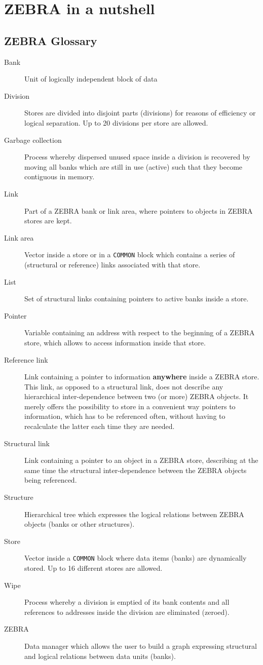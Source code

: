 \chapter{\protect\label{NUTSHEL}ZEBRA in a nutshell}
\section{ZEBRA Glossary}
\begin{description}
\item[Bank]Unit of logically independent block of data
\item[Division]Stores are divided into disjoint parts (divisions)
for reasons of efficiency or logical separation.
Up to 20 divisions per store are allowed.
\item[Garbage collection]Process whereby dispersed unused space
inside a division is recovered by moving all banks which are still
in use (active) such that they become contiguous in memory.
\item[Link]Part of a ZEBRA bank or link area, where pointers to objects
in ZEBRA stores are kept.
\item[Link area]Vector inside a store or in a {\tt COMMON} block which
contains a series of (structural or reference) links associated with that
store. \item[List]Set of structural links containing
pointers to active banks inside a store.
\item[Pointer]Variable containing an address with respect to the beginning of
a ZEBRA store, which allows to access information inside that store.
\item[Reference link]Link containing a pointer to information {\bf anywhere}
inside a ZEBRA store.
This link, as opposed to a structural link, does not describe
any hierarchical inter-dependence between two (or more) ZEBRA objects.
It merely offers the possibility to store in a convenient way
pointers to information, which has to be referenced often,
without having to recalculate the latter each time they are needed.
\item[Structural link]Link containing a pointer to an object in a ZEBRA store,
describing at the same time the structural inter-dependence
between the ZEBRA objects being referenced.
\item[Structure]Hierarchical tree which expresses the logical relations
between ZEBRA objects (banks or other structures).
\item[Store]Vector inside a {\tt COMMON} block where data items (banks) 
are dynamically stored. Up to 16 different stores are allowed.
\item[Wipe]Process whereby a division is emptied of its bank contents
and all references to addresses inside the division are eliminated (zeroed).
\item[ZEBRA]Data manager which allows the user to build a graph
expressing structural and logical relations between data units (banks).
\end{description}
